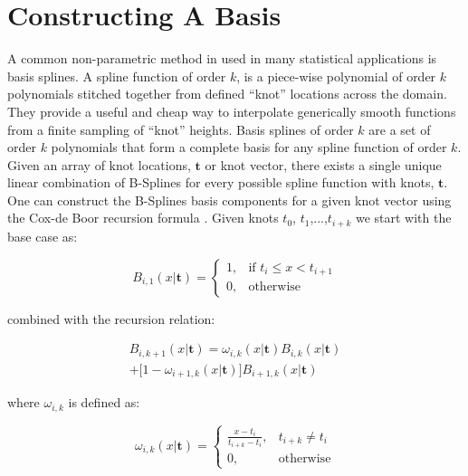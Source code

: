 \section{Constructing A Basis} \label{sec:basis_splines}

A common non-parametric method in used in many statistical applications is basis splines. A spline function of order $k$, 
is a piece-wise polynomial of order $k$ polynomials stitched together from defined ``knot'' locations across the domain. 
They provide a useful and cheap way to interpolate generically smooth functions from a finite sampling of ``knot'' heights. 
Basis splines of order $k$ are a set of order $k$ polynomials that form a complete basis for any spline function of order $k$. 
Given an array of knot locations, $\mathbf{t}$ or knot vector, there exists a single unique linear combination of B-Splines for 
every possible spline function with knots, $\mathbf{t}$. One can construct the B-Splines basis components for a given knot vector 
using the Cox-de Boor recursion formula \cite{deBoor78}. Given knots $t_0$, $t_1$,...,$t_{i+k}$ we start with the base case as:

\begin{equation}
    B_{i,1}(x | \mathbf{t}) = 
    \begin{cases}
        1, & \text{if } t_i \leq x < t_{i+1} \\
        0, & \text{otherwise}
    \end{cases}
\end{equation}

\noindent combined with the recursion relation:

\begin{multline*}
    B_{i,k+1}(x | \mathbf{t}) = \omega_{i,k}(x | \mathbf{t})B_{i,k}(x | \mathbf{t})\\
                                + \big[1-\omega_{i+1,k}(x | \mathbf{t})\big] B_{i+1,k}(x | \mathbf{t})
\end{multline*}

\noindent where $\omega_{i,k}$ is defined as:

\begin{equation}
\omega_{i,k}(x | \mathbf{t}) =
\begin{cases}
    \frac{x-t_i}{t_{i+k}-t_i}, & t_{i+k} \neq t_i \\
    0, & \text{otherwise}
\end{cases}
\end{equation}

